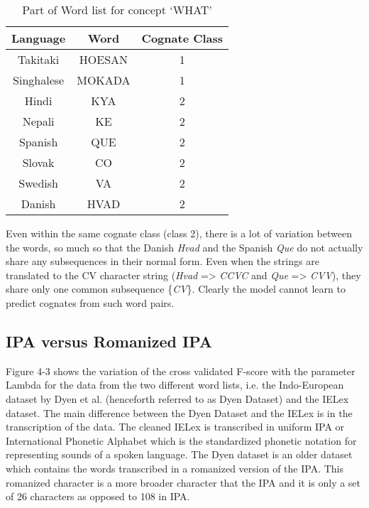 \begin{table}[h!]
\centering
\label{my-label}
\begin{tabular}{|c|c|c|}
\hline
\textbf{Language} & \textbf{Word} & \textbf{Cognate Class} \\ \hline
Takitaki          & HOESAN        & 1                      \\ \hline
Singhalese        & MOKADA        & 1                      \\ \hline
Hindi             & KYA           & 2                      \\ \hline
Nepali            & KE            & 2                      \\ \hline
Spanish           & QUE           & 2                      \\ \hline
Slovak            & CO            & 2                      \\ \hline
Swedish           & VA            & 2                      \\ \hline
Danish            & HVAD          & 2                      \\ \hline
\end{tabular}
\caption{Part of Word list for concept `WHAT'}
\end{table}

Even within the same cognate class (class 2), there is a lot of variation between the words, so much so that the Danish \textit{Hvad} and the Spanish \textit{Que} do not actually share any subsequences in their normal form. Even when the strings are translated to the CV character string (\textit{Hvad} => \textit{CCVC} and \textit{Que} => \textit{CVV}), they share only one common subsequence \{\textit{CV}\}. Clearly the model cannot learn to predict cognates from such word pairs.

\subsection{IPA versus Romanized IPA}

Figure 4-3 shows the variation of the cross validated F-score with the parameter Lambda for the data from the two different word lists, i.e. the Indo-European dataset by Dyen et al. (henceforth referred to as Dyen Dataset) and the IELex dataset. The main difference between the Dyen Dataset and the IELex is in the transcription of the data. The cleaned IELex is transcribed in uniform IPA or International Phonetic Alphabet which is the standardized phonetic notation for representing sounds of a spoken language. The Dyen dataset is an older dataset which contains the words transcribed in a romanized version of the IPA. This romanized character is a more broader character that the IPA and it is only a set of 26 characters as opposed to 108 in IPA.

